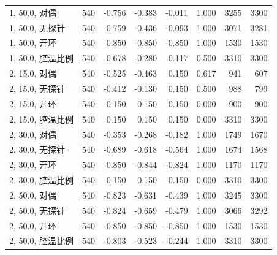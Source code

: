 \begin{longtable}{lrrrrrrr}
1, 50.0, 对偶 & 540 & -0.756 & -0.383 & -0.011 & 1.000 & 3255 & 3300 \\
1, 50.0, 无探针 & 540 & -0.759 & -0.436 & -0.093 & 1.000 & 3071 & 3281 \\
1, 50.0, 开环 & 540 & -0.850 & -0.850 & -0.850 & 1.000 & 1530 & 1530 \\
1, 50.0, 腔温比例 & 540 & -0.678 & -0.280 & 0.117 & 0.500 & 3310 & 3300 \\
2, 15.0, 对偶 & 540 & -0.525 & -0.463 & 0.150 & 0.617 & 941 & 607 \\
2, 15.0, 无探针 & 540 & -0.412 & -0.130 & 0.150 & 0.500 & 988 & 799 \\
2, 15.0, 开环 & 540 & 0.150 & 0.150 & 0.150 & 0.000 & 900 & 900 \\
2, 15.0, 腔温比例 & 540 & 0.150 & 0.150 & 0.150 & 0.000 & 3310 & 3300 \\
2, 30.0, 对偶 & 540 & -0.353 & -0.268 & -0.182 & 1.000 & 1749 & 1670 \\
2, 30.0, 无探针 & 540 & -0.689 & -0.618 & -0.564 & 1.000 & 1674 & 1568 \\
2, 30.0, 开环 & 540 & -0.850 & -0.844 & -0.824 & 1.000 & 1170 & 1170 \\
2, 30.0, 腔温比例 & 540 & 0.150 & 0.150 & 0.150 & 0.000 & 3310 & 3300 \\
2, 50.0, 对偶 & 540 & -0.823 & -0.631 & -0.439 & 1.000 & 3245 & 3300 \\
2, 50.0, 无探针 & 540 & -0.824 & -0.659 & -0.479 & 1.000 & 3066 & 3292 \\
2, 50.0, 开环 & 540 & -0.850 & -0.850 & -0.850 & 1.000 & 1530 & 1530 \\
2, 50.0, 腔温比例 & 540 & -0.803 & -0.523 & -0.244 & 1.000 & 3310 & 3300 \\
\bottomrule
\end{longtable}

